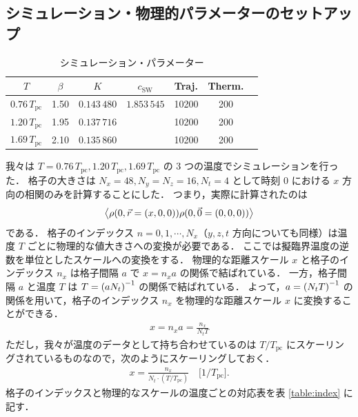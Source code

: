\documentclass[dvipdfmx, a4paper]{jarticle}
\numberwithin{equation}{section}
\begin{document}
\subsection{シミュレーション・物理的パラメーターのセットアップ}
\begin{table}[b]
  \caption{シミュレーション・パラメーター}
  \label{table:parameters}  
  \centering
  \begin{tabular}{ccccccc}
    \hline\hline
    $T$                     & $\beta$ & $K$           & $c_\mathrm{SW}$ & Traj. & Therm. & \\
    \hline
    $0.76 \, T_\mathrm{pc}$ & 1.50    & $0.143\,480$  &  $1.853\,545$   & 10200  & 200    & \\
    $1.20 \, T_\mathrm{pc}$ & 1.95    & $0.137\,716$  &                 & 10200  & 200    & \\
    $1.69 \, T_\mathrm{pc}$ & 2.10    & $0.135\,860$  &                 & 10200  & 200    & \\
    \hline
    \hline
  \end{tabular}
\end{table}
我々は $T = 0.76 \, T_\mathrm{pc}, 1.20 \, T_\mathrm{pc}, 1.69 \, T_\mathrm{pc}$ の 3 つの温度でシミュレーションを行った．
格子の大きさは $N_x = 48, N_y = N_z = 16, N_t = 4$ として時刻 $0$ における $x$ 方向の相関のみを計算することにした．
つまり，実際に計算されたのは
\begin{align}
  \ev{\rho(0, \vec{r} = \qty(x, 0, 0))\rho(0, \vec{0} = \qty(0, 0, 0))}
\end{align}
である．
格子のインデックス $n = 0, 1, \cdots, N_x$（$y, z, t$ 方向についても同様）は温度 $T$ ごとに物理的な値大きさへの変換が必要である．
ここでは擬臨界温度の逆数を単位としたスケールへの変換をする．
物理的な距離スケール $x$ と格子のインデックス $n_x$ は格子間隔 $a$ で $x = n_xa$ の関係で結ばれている．
一方，格子間隔 $a$ と温度 $T$ は $T = \qty(aN_t)^{-1}$ の関係で結ばれている．
よって，$a = \qty(N_t T)^{-1}$ の関係を用いて，格子のインデックス $n_x$ を物理的な距離スケール $x$ に変換することができる．
\begin{align}
  x = n_xa = \frac{n_x}{N_t T}
\end{align}
ただし，我々が温度のデータとして持ち合わせているのは $T/T_\mathrm{pc}$ にスケーリングされているものなので，次のようにスケーリングしておく．
\begin{align}
  x = \frac{n_x}{N_t \cdot (T / T_\mathrm{pc})} \quad \Big[1/T_\mathrm{pc}\Big].
\end{align}
格子のインデックスと物理的なスケールの温度ごとの対応表を表 \ref{table:index} に記す．
\end{document}
